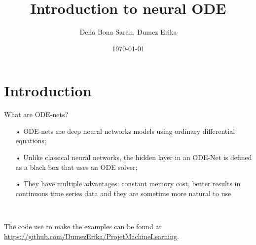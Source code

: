 \documentclass[11pt]{beamer}
\title{Introduction to neural ODE}
\author{Della Bona Sarah, Dumez Erika}
\date{\today}
\begin{document}
\AtBeginSubsection[]{
\begin{frame}
\tableofcontents[ 
    currentsubsection, 
    hideothersubsections, 
    sectionstyle=show/shaded, 
    subsectionstyle=show/hide
    ]

\end{frame}}

\AtBeginSection[]{
\begin{frame}
\tableofcontents[ 
    currentsection, 
    hideothersubsections, 
    sectionstyle=show/shaded, 
    subsectionstyle=show/hide
    ]

\end{frame}}

\begin{frame}
\titlepage
\end{frame}

\begin{frame}
\tableofcontents[hidesubsections]
\end{frame}

\section{Introduction}
\begin{frame}{What are ODE-nets?}

\begin{itemize}
\item[•] ODE-nets are deep neural networks models using ordinary differential equations;
\item[•] Unlike classical neural networks, the hidden layer in an ODE-Net is defined as a black box that uses an ODE solver;
\item[•] They have multiple advantages: constant memory cost, better results in continuous time series data and they are sometime more natural to use
\end{itemize}

~

The code use to make the examples can be found at \url{https://github.com/DumezErika/ProjetMachineLearning}.
\end{frame}
\end{document}
